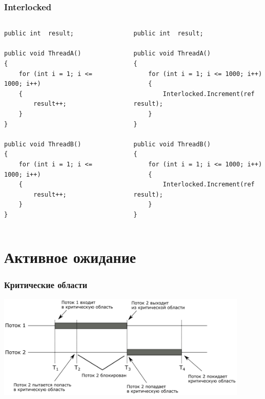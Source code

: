 \documentclass[xetex,mathserif,serif]{beamer}
\begin{document}
    \begin{frame}[fragile]
        \frametitle{Interlocked}
        \begin{small}
            \begin{columns}
                \begin{column}{0.4\textwidth}
                    \begin{verbatim}
public int  result;

public void ThreadA()
{
    for (int i = 1; i <= 1000; i++) 
    {
        result++;
    }
}

public void ThreadB()
{
    for (int i = 1; i <= 1000; i++) 
    {
        result++; 
    }
}
                    \end{verbatim}
                \end{column}
                \begin{column}{0.05\textwidth}
                    \rule{0.1mm}{0.8\textheight}
                \end{column}
                \begin{column}{0.5\textwidth}
                    \begin{verbatim}
public int  result;

public void ThreadA()
{
    for (int i = 1; i <= 1000; i++) 
    {
        Interlocked.Increment(ref result);
    }
}

public void ThreadB()
{
    for (int i = 1; i <= 1000; i++) 
    {
        Interlocked.Increment(ref result); 
    }
}
                    \end{verbatim}
                \end{column}
            \end{columns}
        \end{small}
    \end{frame}

    \section{Активное ожидание}

    \begin{frame}
        \frametitle{Критические области}
        \begin{center}
            \includegraphics[width=0.9\textwidth]{criticalSections.png}
        \end{center}
    \end{frame}
\end{document}
